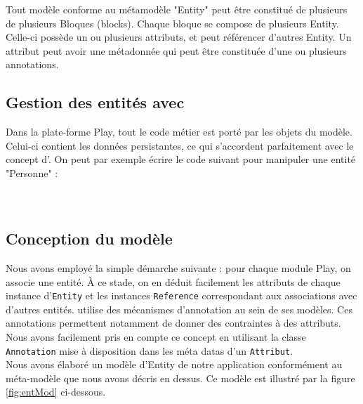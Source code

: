 Tout modèle conforme au métamodèle "Entity" peut être constitué de plusieurs de plusieurs Bloques (blocks). Chaque bloque se compose de plusieurs Entity. Celle-ci possède un ou plusieurs attributs, et peut référencer d'autres Entity. Un attribut peut avoir une métadonnée qui peut être constituée d'une ou plusieurs annotations.   

\subsection{Gestion des entités avec \kwplay{}}
Dans la plate-forme Play, tout le code métier est porté par les objets du modèle. Celui-ci contient les données persistantes, ce qui s'accordent parfaitement avec le concept d'\kwentity.  
On peut par exemple écrire le code suivant pour manipuler une entité "Personne" :\\
         
\\
\\
\subsection{Conception du modèle}
Nous avons employé la simple démarche suivante : pour chaque module Play, on associe une entité. À ce stade, on en déduit facilement les attributs de chaque instance d'\verb+Entity+ et les instances \verb+Reference+ correspondant aux associations avec d'autres entités. \kwplay{} utilise des mécanismes d'annotation au sein de ses modèles. Ces annotations permettent notamment de donner des contraintes à des attributs. Nous avons facilement pris en compte ce concept en utilisant la classe \verb+Annotation+ mise à disposition dans les méta datas d'un \verb+Attribut+.\\
Nous avons élaboré un modèle d'Entity de notre application conformément au méta-modèle que nous avons décris en dessus. Ce modèle est illustré par la figure \ref{fig:entMod} ci-dessous.

